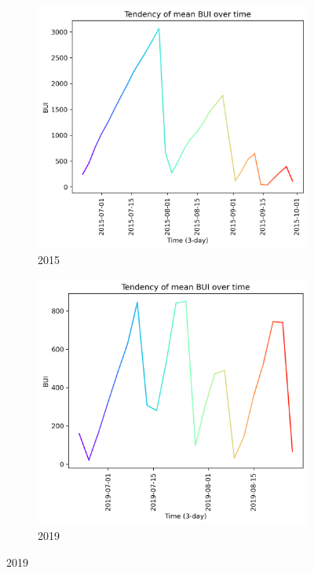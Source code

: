 \begin{figure}[h]
	\caption{BUI mean tendency graph}
	\centering
	\begin{subfigure}{0.49\textwidth}
		\centering
		\includegraphics[width=\textwidth]{graphs/all_time/2015_tendency_graph_BUI.png}
		\caption{2015}
		\label{fig:mean_tendency_bui_2015}
	\end{subfigure}
	\hfill
	\begin{subfigure}{0.49\textwidth}
		\centering
		\includegraphics[width=\textwidth]{graphs/all_time/2019_tendency_graph_BUI.png}
		\caption{2019}
		\label{fig:mean_tendency_bui_2019}
	\end{subfigure}
	\label{fig:mean_tendency_bui}
\end{figure}




